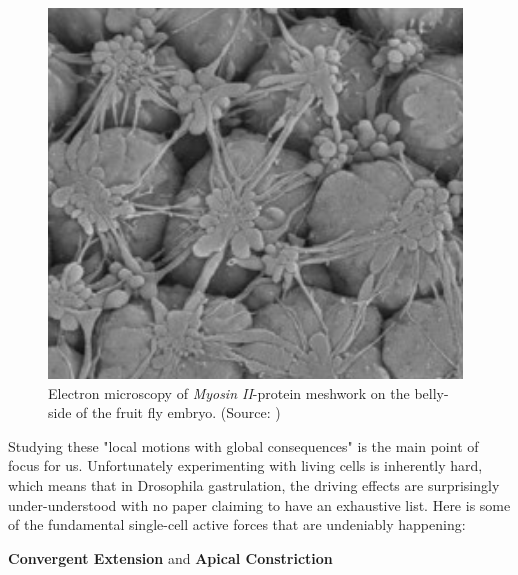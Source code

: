 \begin{figure}[H]
    \centering
    \includegraphics[width=0.6\linewidth]{chapters/Theory/figures/EM_constricting_proteins.png}
    \caption{Electron microscopy of\textit{ Myosin II}-protein meshwork on the belly-side of the fruit fly embryo. (Source: )}
    \label{fig:mysosinMeshwork}
\end{figure}


Studying these "local motions with global consequences" is the main point of focus for us. Unfortunately experimenting with living cells is inherently hard, which means that in Drosophila gastrulation, the driving effects are surprisingly under-understood with no paper claiming to have an exhaustive list. Here is some of the fundamental single-cell active forces that are undeniably happening:

\textbf{Convergent Extension} and \textbf{Apical Constriction}

